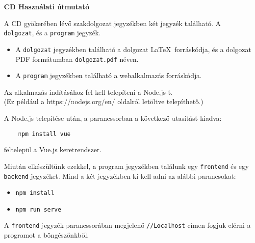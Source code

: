 \pagestyle{empty}

\noindent \textbf{\Large CD Használati útmutató}

\vskip 1cm

\noindent A CD gyökerében lévő szakdolgozat jegyzékben két jegyzék található. A \texttt{dolgozat}, és a \texttt{program} jegyzék. 
\begin{itemize}
\item A \texttt{dolgozat} jegyzékben található a dolgozat \LaTeX\ forráskódja, és a dolgozat PDF formátumban \texttt{dolgozat.pdf} néven. 
\item A \texttt{program} jegyzékben található a webalkalmazás forráskódja.
\end{itemize}

\bigskip

\noindent Az alkalmazás indításához fel kell telepíteni a Node.js-t.\\
(Ez például a https://nodejs.org/en/ oldalról letöltve telepíthető.)

\bigskip

\noindent A Node.js telepítése után, a parancssorban a következő utasítást kiadva:
\begin{verbatim}
    npm install vue
\end{verbatim}
feltelepül a Vue.js keretrendszer.

Miután elkészültünk ezekkel, a program jegyzékben találunk egy \texttt{frontend} és egy \texttt{backend} jegyzéket. Mind a két jegyzékben ki kell adni az alábbi parancsokat: 
\begin{itemize}
    \item \texttt{npm install}
    \item \texttt{npm run serve}
\end{itemize}

A \texttt{frontend} jegyzék parancssorában megjelenő \texttt{//Localhost} címen fogjuk elérni a programot a böngészőnkből.
